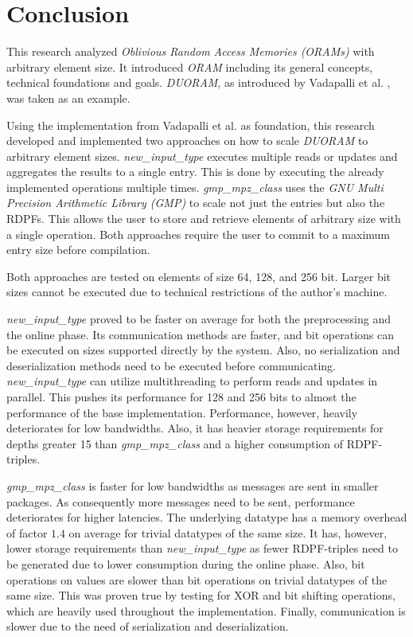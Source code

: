 \chapter{Conclusion}
\label{ch:Conclusion}
This research analyzed \textit{Oblivious Random Access Memories (ORAMs)} with arbitrary element size.
It introduced \textit{ORAM} including its general concepts, technical foundations and goals.
\textit{DUORAM}, as introduced by Vadapalli et al. \cite{vadapalli2023duoram}, was taken as an example.

Using the implementation from Vadapalli et al. \cite{vadapalli2023duoram} as foundation, this research developed and implemented two approaches on how to scale \textit{DUORAM} to arbitrary element sizes.
\textit{new\_input\_type} executes multiple reads or updates and aggregates the results to a single entry.
This is done by executing the already implemented operations multiple times.
\textit{gmp\_mpz\_class} uses the \textit{GNU Multi Precision Arithmetic Library (GMP)} to scale not just the entries but also the RDPFs.
This allows the user to store and retrieve elements of arbitrary size with a single operation.
Both approaches require the user to commit to a maximum entry size before compilation.

Both approaches are tested on elements of size 64, 128, and 256 bit.
Larger bit sizes cannot be executed due to technical restrictions of the author's machine.

\textit{new\_input\_type} proved to be faster on average for both the preprocessing and the online phase.
Its communication methods are faster, and bit operations can be executed on sizes supported directly by the system.
Also, no serialization and deserialization methods need to be executed before communicating.
\textit{new\_input\_type} can utilize multithreading to perform reads and updates in parallel.
This pushes its performance for 128 and 256 bits to almost the performance of the base implementation.
Performance, however, heavily deteriorates for low bandwidths.
Also, it has heavier storage requirements for depths greater 15 than \textit{gmp\_mpz\_class} and a higher consumption of RDPF-triples.

\textit{gmp\_mpz\_class} is faster for low bandwidths as messages are sent in smaller packages.
As consequently more messages need to be sent, performance deteriorates for higher latencies.
The underlying datatype  has a memory overhead of factor $1.4$ on average for trivial datatypes of the same size.
It has, however, lower storage requirements than \textit{new\_input\_type} as fewer RDPF-triples need to be generated due to lower consumption during the online phase.
Also, bit operations on  values are slower than bit operations on trivial datatypes of the same size.
This was proven true by testing for XOR and bit shifting operations, which are heavily used throughout the implementation.
Finally, communication is slower due to the need of serialization and deserialization.

